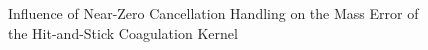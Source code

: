 \newpage


\newpage

\begin{figure}[h!]
    \centering
    \begin{minipage}{.5\linewidth}
        \centering
    \end{minipage}%
    \begin{minipage}{.5\linewidth}
        \centering
    \end{minipage}
    \caption{Influence of Near-Zero Cancellation Handling on the Mass Error of the
        Hit-and-Stick Coagulation Kernel}
\end{figure}

\newpage
